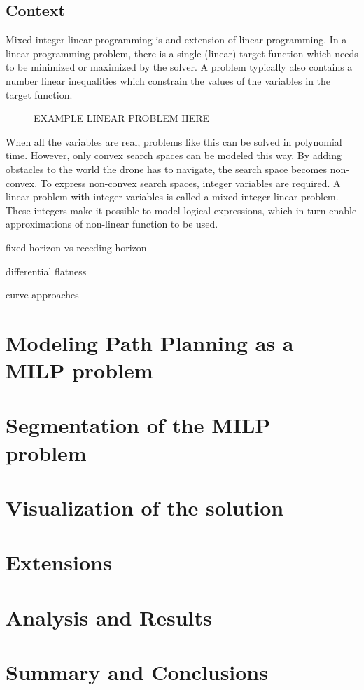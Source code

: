 \documentclass[12pt]{article}
\begin{document}
\subsection{Context}
\label{subsec:previous}
Mixed integer linear programming is and extension of linear programming. In a linear programming problem, there is a single (linear) target function which needs to be minimized or maximized by the solver. A problem typically also contains a number linear inequalities which constrain the values of the variables in the target function.
\begin{figure}[placement specifier]
EXAMPLE LINEAR PROBLEM HERE
\end{figure}
When all the variables are real, problems like this can be solved in polynomial time. However, only convex search spaces can be modeled this way. By adding obstacles to the world the drone has to navigate, the search space becomes non-convex. To express non-convex search spaces, integer variables are required\cite{Schouwenaars2001}. A linear problem with integer variables is called a mixed integer linear problem. These integers make it possible to model logical expressions, which in turn enable approximations of non-linear function to be used.
\par
fixed horizon vs receding horizon \cite{Bellingham2002}
\par
differential flatness \cite{Fliess1995a} \cite{Hao2005} \cite{Cowling2007} \cite{Mellinger2011}
\par
curve approaches \cite{Deits2015} \cite{Flores2007}

\section{Modeling Path Planning as a MILP problem}
\label{section:modeling}

\section{Segmentation of the MILP problem}
\label{section:segment}

\section{Visualization of the solution}
\label{section:visual}

\section{Extensions}
\label{section:extension}

\section{Analysis and Results}
\label{section:result}

\section{Summary and Conclusions}
\label{section:summary}



\end{document}

